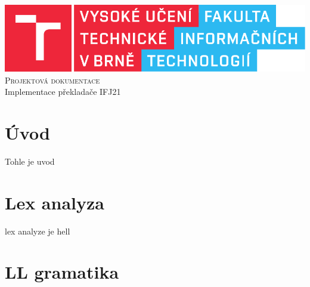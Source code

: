 \documentclass[11pt]{article}
\begin{document}
\begin{titlepage}
    \begin{center}
        \includegraphics[scale=0.8]{pics/fitlogo.pdf} \\
    
        \textsc{\Huge Projektová dokumentace}\\
        
        \LARGE
            Implementace překladače IFJ21
    \end{center}
    

\end{titlepage}

\newpage
\tableofcontents
\thispagestyle{empty}
\newpage
\setcounter{page}{1}


\section*{Úvod}
Tohle je uvod



\section{Lex analyza}
lex analyze je hell

\section{LL gramatika}
\end{document}
